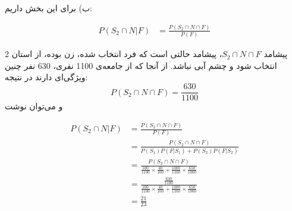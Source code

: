 \documentclass{article}
\newcommand{\eqn}[1]{
\[\begin{split}
#1
\end{split}\]
}
\begin{document}
ب) برای این بخش داریم:

\eqn{
P(S_2\cap N|F)&=
\frac{P(S_2\cap N\cap F)}{P(F)}
}
پیشامد $S_2\cap N\cap F$، پیشامد حالتی است که فرد انتخاب شده، زن بوده، از استان 2 انتخاب شود و چشم آبی نباشد. از آنجا که از جامعه‌ی 1100 نفری، 630 نفر چنین ویژگی‌ای دارند در نتیجه:
$$
P(S_2\cap N\cap F)=\frac{630}{1100}
$$
و می‌توان نوشت
\eqn{
P(S_2\cap N|F)&=
\frac{P(S_2\cap N\cap F)}{P(F)}
\\&=
\frac{P(S_2\cap N\cap F)}{P(S_1)P(F|S_1)+P(S_2)P(F|S_2)}
\\&=
\frac{P(S_2\cap N\cap F)}{
\frac{100}{1100}\times \frac{40}{100}+\frac{1000}{1100}\times \frac{650}{1000}
}
\\&=
\frac{\frac{630}{1100}}{
\frac{100}{1100}\times \frac{40}{100}+\frac{1000}{1100}\times \frac{650}{1000}
}
\\&=
\frac{21}{23}
}
\end{document}
